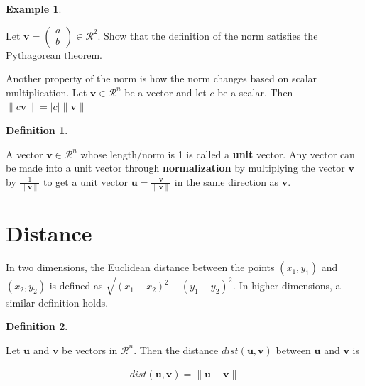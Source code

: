 \documentclass[
]{book}
\theoremstyle{definition}
\newtheorem{definition}{Definition}[chapter]
\theoremstyle{definition}
\newtheorem{example}{Example}[chapter]
\theoremstyle{definition}
\theoremstyle{remark}
\begin{document}
\begin{example}
\protect\hypertarget{exm:unlabeled-div-188}{}\label{exm:unlabeled-div-188}

Let \(\mathbf{v} = \begin{pmatrix} a \\ b \end{pmatrix} \in \mathcal{R}^2\). Show that the definition of the norm satisfies the Pythagorean theorem.

\end{example}

Another property of the norm is how the norm changes based on scalar multiplication. Let \(\mathbf{v} \in \mathcal{R}^n\) be a vector and let \(c\) be a scalar. Then \(\|c \mathbf{v}\| = |c|\|\mathbf{v}\|\)

\begin{definition}
\protect\hypertarget{def:unlabeled-div-189}{}\label{def:unlabeled-div-189}

A vector \(\mathbf{v} \in \mathcal{R}^n\) whose length/norm is 1 is called a \textbf{unit} vector. Any vector can be made into a unit vector through \textbf{normalization} by multiplying the vector \(\mathbf{v}\) by \(\frac{1}{\|\mathbf{v}\|}\) to get a unit vector \(\mathbf{u} = \frac{\mathbf{v}}{\|\mathbf{v}\|}\) in the same direction as \(\mathbf{v}\).

\end{definition}

\hypertarget{distance}{%
\section{Distance}\label{distance}}

In two dimensions, the Euclidean distance between the points \((x_1, y_1)\) and \((x_2, y_2)\) is defined as \(\sqrt{(x_1 - x_2)^2 + (y_1 - y_2)^2}\). In higher dimensions, a similar definition holds.

\begin{definition}
\protect\hypertarget{def:unlabeled-div-190}{}\label{def:unlabeled-div-190}

Let \(\mathbf{u}\) and \(\mathbf{v}\) be vectors in \(\mathcal{R}^n\). Then the distance \(dist(\mathbf{u}, \mathbf{v})\) between \(\mathbf{u}\) and \(\mathbf{v}\) is

\[
\begin{aligned}
dist(\mathbf{u}, \mathbf{v}) = \|\mathbf{u} - \mathbf{v}\|
\end{aligned}
\]

\end{definition}
\end{document}
